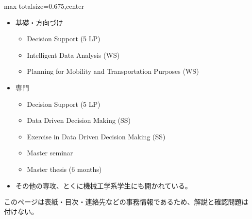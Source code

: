 \clearpage
{}
\begin{adjustbox}{max totalsize={\textwidth}{0.675\textheight},center}
\begin{minipage}{\textwidth}\scriptsize
\begin{minipage}[t]{0.485\textwidth}
\begin{itemize}
\item 基礎・方向づけ
\begin{itemize}
\item Decision Support (5 LP)
\item Intelligent Data Analysis (WS)
\item Planning for Mobility and Transportation Purposes (WS)
\end{itemize}
\item 専門
\begin{itemize}
\item Decision Support (5 LP)
\item Data Driven Decision Making (SS)
\item Exercise in Data Driven Decision Making (SS)
\item Master seminar
\item Master thesis (6 months)
\end{itemize}
\item その他の専攻、とくに機械工学系学生にも開かれている。
\end{itemize}
\end{minipage}\hfill
\begin{minipage}[t]{0.485\textwidth}
{\small このページは表紙・目次・連絡先などの事務情報であるため、解説と確認問題は付けない。}
\end{minipage}
\end{minipage}
\end{adjustbox}

